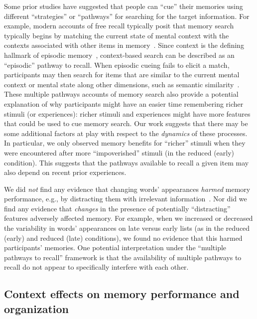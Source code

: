 \documentclass[11pt]{article}
\begin{document}
Some prior studies have suggested that people can ``cue'' their memories using
different ``strategies'' or ``pathways'' for searching for the target
information. For example, modern accounts of free recall typically posit that
memory search typically begins by matching the current state of mental context
with the contexts associated with other items in memory~\citep{Kaha20}. Since
context is the defining hallmark of episodic memory~\citep{Tulv83},
context-based search can be described as an ``episodic'' pathway to recall.
When episodic cueing fails to elicit a match, participants may then search for
items that are similar to the current mental context or mental state along
other dimensions, such as semantic similarity~\citep{DavaEtal03, SochEtal09}.
These multiple pathways accounts of memory search also provide a potential
explanation of why participants might have an easier time remembering richer
stimuli (or experiences): richer stimuli and experiences might have more
features that could be used to cue memory search. Our work suggests that there
may be some additional factors at play with respect to the \textit{dynamics} of
these processes. In particular, we only observed memory benefits for ``richer''
stimuli when they were encountered after more ``impoverished'' stimuli (in the
reduced (early) condition). This suggests that the pathways available to recall
a given item may also depend on recent prior experiences.

We did \textit{not} find any evidence that changing words' appearances
\textit{harmed} memory performance, e.g., by distracting them with irrelevant
information~\citep{MarsEtal15, Lang05, MarsEtal12, ReinEtal92}. Nor did we find
any evidence that \textit{changes} in the presence of potentially
``distracting'' features adversely affected memory. For example, when we
increased or decreased the variability in words' appearances on late versus
early lists (as in the reduced (early) and reduced (late) conditions), we found
no evidence that this harmed participants' memories. One potential
interpretation under the ``multiple pathways to recall'' framework is that the
availability of multiple pathways to recall do not appear to specifically
interfere with each other.

\subsection*{Context effects on memory performance and organization}
\end{document}
